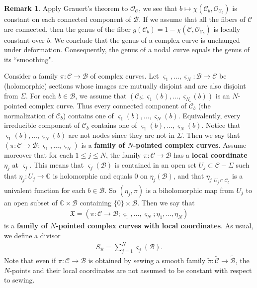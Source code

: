 \documentclass[12pt,a4paper,notitlepage]{report}
\theoremstyle{definition}
\newtheorem{rem}[df]{Remark}
\theoremstyle{plain}
\newcommand{\fk}{\mathfrak}
\newcommand{\mc}{\mathcal}
\newcommand{\wtd}{\widetilde}
\newcommand{\scr}{\mathscr}
\newcommand{\sgm}{\varsigma}
\newcommand{\SX}{S_{\fk X}}
\newcommand{\mbb}{\mathbb}
\newcommand{\Cbb}{\mathbb C}
\newcommand{\Zbb}{\mathbb Z}
\numberwithin{equation}{section}
\begin{document}
\begin{rem}\label{lb124}
Apply Grauert's theorem to $\scr O_{\mc C}$, we see that $b\mapsto\chi(\mc C_b,\scr O_{\mc C_b})$ is constant on each connected component of $\mc B$. If we assume that all the fibers of $\mc C$ are  connected, then the genus of the fiber $g(\mc C_b)=1-\chi(\mc C,\scr O_{\mc C_b})$ is locally constant over $b$. We conclude that the genus of a complex curve is unchanged under deformation. Consequently, the genus of a nodal curve equals the genus of its ``smoothing". 
\end{rem}

Consider a family $\pi:\mc C\rightarrow\mc B$ of complex curves. Let $\sgm_1,\dots,\sgm_N:\mc B\rightarrow\mc C$ be (holomorphic) sections whose images are mutually disjoint and are also disjoint from $\Sigma$. For each $b\in\mc B$, we assume that $(\mc C_b;\sgm_1(b),\dots,\sgm_N(b))$ is an $N$-pointed complex curve. Thus every connected component of $\wtd{\mc C}_b$ (the normalization  of $\mc C_b$) contains one of $\sgm_1(b),\dots,\sgm_N(b)$. Equivalently, every irreducible component of $\mc C_b$ contains one of $\sgm_1(b),\dots,\sgm_N(b)$. Notice that  $\sgm_1(b),\dots,\sgm_N(b)$ are not nodes since they are not in $\Sigma$. Then we say that $(\pi:\mc C\rightarrow\mc B;\sgm_1,\dots,\sgm_N)$ is a \textbf{family of $N$-pointed complex curves}. Assume moreover that for each $1\leq j\leq N$, the family $\pi:\mc C\rightarrow\mc B$ has a \textbf{local coordinate} $\eta_j$ at $\sgm_j$. This means that $\sgm_j(\mc B)$ is contained in an open set $U_j\subset\mc C-\Sigma$ such that $\eta_j:U_j\rightarrow\Cbb$ is holomorphic and equals $0$ on $\eta_j(\mc B)$,  and that $\eta_j|_{U_j\cap\mc C_b}$ is a univalent function  for each $b\in\mc B$. So $(\eta_j,\pi)$ is a biholomorphic map from $U_j$ to an open subset of $\mbb C\times\mc B$ containing $\{0\}\times\mc B$. Then we say that 
\begin{align*}
\fk X=(\pi:\mc C\rightarrow\mc B;\sgm_1,\dots,\sgm_N;\eta_1,\dots,\eta_N)
\end{align*}
is a \textbf{family of $N$-pointed complex curves with local coordinates}. As usual, we define a divisor
\begin{align*}
\SX=\sum_{j=1}^N\sgm_j(\mc B).
\end{align*}
Note that even if $\pi:\mc C\rightarrow\mc B$ is obtained by sewing a smooth family $\wtd{\pi}:\wtd{\mc C}\rightarrow\wtd{\mc B}$, the $N$-points and their local coordinates are not assumed to be constant with respect to sewing.
\end{document}

